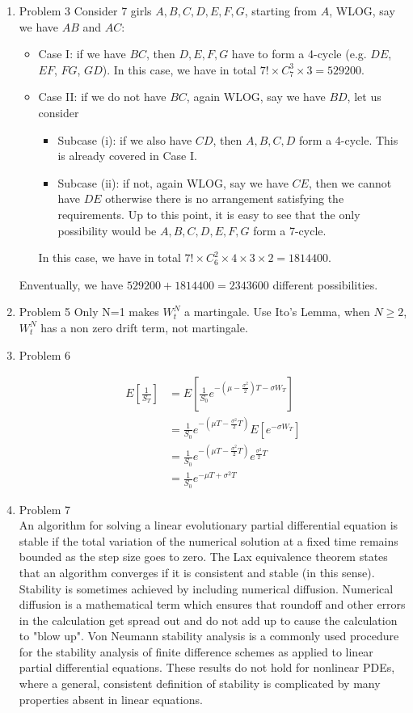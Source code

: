 \documentclass[10pt, onecolumn, draftcls]{IEEEtran}
\begin{document}
\begin{enumerate}
\item Problem 3
Consider 7 girls $A, B, C, D, E, F, G$, starting from $A$, WLOG, say we have $AB$ and $AC$:
\begin{itemize}
\item Case I: if we have $BC$, then $D, E, F, G$ have to form a 4-cycle (e.g. $DE$, $EF$, $FG$, $GD$). In this case, we have in total $7!\times C_7^3\times 3 = 529200$.
\item Case II: if we do not have $BC$, again WLOG, say we have $BD$, let us consider
\begin{itemize}
\item Subcase (i): if we also have $CD$, then $A, B, C, D$ form a 4-cycle. This is already covered in Case I.
\item Subcase (ii): if not, again WLOG, say we have $CE$, then we cannot have $DE$ otherwise there is no arrangement satisfying the requirements. Up to this point,  it is easy to see that the only possibility would be $A, B, C, D, E, F, G$ form a 7-cycle.
\end{itemize}
In this case, we have in total $7!\times C_6^2\times 4\times 3\times 2 = 1814400$.
\end{itemize}
Enventually, we have $529200 + 1814400 = 2343600$ different possibilities.


\item Problem 5
Only N=1 makes $W_{t}^N$ a martingale.
Use Ito's Lemma, when $N\geq 2$, $W_{t}^N$ has a non zero drift term, not martingale.

\item Problem 6

\begin{align}
E[\frac{1}{S_{T}}]&=E[\frac{1}{S_{0}}e^{-(\mu-\frac{\sigma^{2}}{2})T-\sigma W_{T}}] \nonumber\\
&=\frac{1}{S_{0}}e^{-(\mu T-\frac{\sigma^{2}}{2}T)}E[e^{-\sigma W_{T}}] \nonumber \\
&=\frac{1}{S_{0}}e^{-(\mu T-\frac{\sigma^{2}}{2}T)}e^{\frac{\sigma^{2}}{2}T} \nonumber\\
&=\frac{1}{S_{0}}e^{-\mu T + \sigma^{2}T} \nonumber 
\end{align}

\item
Problem 7\\
An algorithm for solving a linear evolutionary partial differential equation is stable if the total variation of the numerical solution at a fixed time remains bounded as the step size goes to zero. The Lax equivalence theorem states that an algorithm converges if it is consistent and stable (in this sense). Stability is sometimes achieved by including numerical diffusion. Numerical diffusion is a mathematical term which ensures that roundoff and other errors in the calculation get spread out and do not add up to cause the calculation to "blow up". Von Neumann stability analysis is a commonly used procedure for the stability analysis of finite difference schemes as applied to linear partial differential equations. These results do not hold for nonlinear PDEs, where a general, consistent definition of stability is complicated by many properties absent in linear equations.


\end{enumerate}
\end{document}
